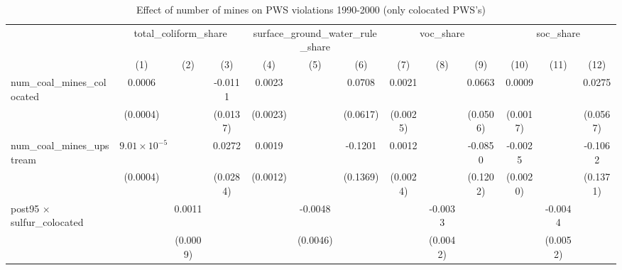 
\begin{table}[htbp]
   \caption{\label{olsrf2sls_nummine_non_mine_vio_1990to2000colocate} Effect of number of mines on PWS violations 1990-2000 (only colocated PWS's)}
   \bigskip
   \centering
   \begin{adjustbox}{width = \textwidth, center}
      \begin{tabular}{lcccccccccccc}
         \toprule
          & \multicolumn{3}{c}{total\_coliform\_share} & \multicolumn{3}{c}{surface\_ground\_water\_rule\_share} & \multicolumn{3}{c}{voc\_share} & \multicolumn{3}{c}{soc\_share}\\
                                                            & (1)                   & (2)           & (3)           & (4)           & (5)           & (6)           & (7)           & (8)           & (9)           & (10)          & (11)          & (12)\\  
         \midrule 
         num\_coal\_mines\_colocated                        & 0.0006                &               & -0.0111       & 0.0023        &               & 0.0708        & 0.0021        &               & 0.0663        & 0.0009        &               & 0.0275\\   
                                                            & (0.0004)              &               & (0.0137)      & (0.0023)      &               & (0.0617)      & (0.0025)      &               & (0.0506)      & (0.0017)      &               & (0.0567)\\   
         num\_coal\_mines\_upstream                         & $9.01\times 10^{-5}$  &               & 0.0272        & 0.0019        &               & -0.1201       & 0.0012        &               & -0.0850       & -0.0025       &               & -0.1062\\   
                                                            & (0.0004)              &               & (0.0284)      & (0.0012)      &               & (0.1369)      & (0.0024)      &               & (0.1202)      & (0.0020)      &               & (0.1371)\\   
         post95 $\times$ sulfur\_colocated                  &                       & 0.0011        &               &               & -0.0048       &               &               & -0.0033       &               &               & -0.0044       &   \\   
                                                            &                       & (0.0009)      &               &               & (0.0046)      &               &               & (0.0042)      &               &               & (0.0052)      &   \\   

\end{tabular}
\end{adjustbox}
\end{table}
